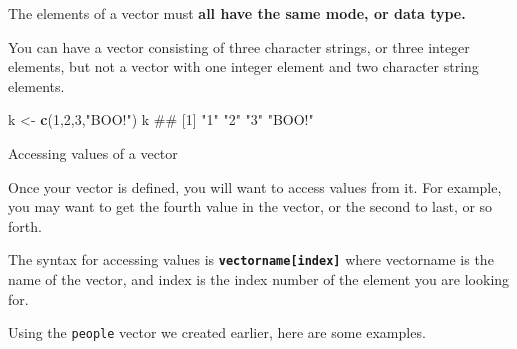 \documentclass[ignorenonframetext,]{beamer}
\newenvironment{Shaded}{\begin{snugshade}}{\end{snugshade}}
\newcommand{\KeywordTok}[1]{\textcolor[rgb]{0.13,0.29,0.53}{\textbf{#1}}}
\newcommand{\DecValTok}[1]{\textcolor[rgb]{0.00,0.00,0.81}{#1}}
\newcommand{\StringTok}[1]{\textcolor[rgb]{0.31,0.60,0.02}{#1}}
\newcommand{\NormalTok}[1]{#1}
\begin{document}
\begin{frame}[fragile]

The elements of a vector must \textbf{all have the same mode, or data
type.}

You can have a vector consisting of three character strings, or three
integer elements, but not a vector with one integer element and two
character string elements.

\begin{Shaded}
\begin{Highlighting}[]
\NormalTok{k <-}\StringTok{ }\KeywordTok{c}\NormalTok{(}\DecValTok{1}\NormalTok{,}\DecValTok{2}\NormalTok{,}\DecValTok{3}\NormalTok{,}\StringTok{"BOO!"}\NormalTok{)}
\NormalTok{k}
\NormalTok{## [1] "1"    "2"    "3"    "BOO!"}
\end{Highlighting}
\end{Shaded}

\end{frame}

\begin{frame}

\begin{block}{Accessing values of a vector}

Once your vector is defined, you will want to access values from it. For
example, you may want to get the fourth value in the vector, or the
second to last, or so forth.

\end{block}

\end{frame}

\begin{frame}[fragile]

The syntax for accessing values is
\textbf{\texttt{vectorname{[}index{]}}} where vectorname is the name of
the vector, and index is the index number of the element you are looking
for.

Using the \texttt{people} vector we created earlier, here are some
examples.

\end{frame}
\end{document}
